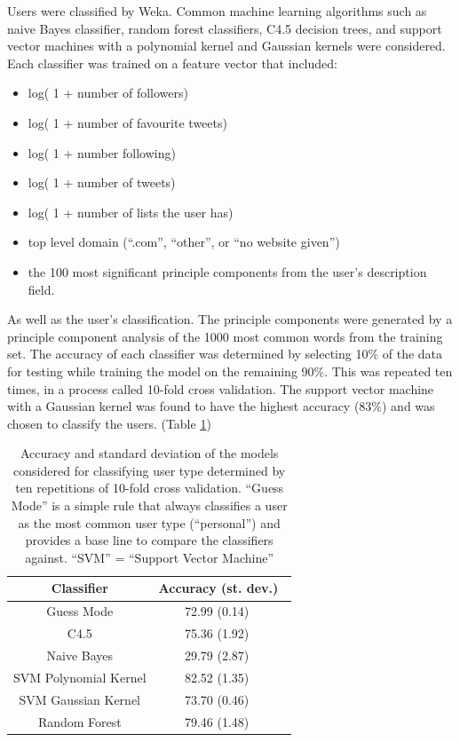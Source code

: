 Users were classified by Weka. Common machine learning algorithms \cite{Burger:2011wl, Go:2009ut, anti2008krause} such as naive Bayes classifier, random forest classifiers, C4.5 decision trees, and support vector machines with a polynomial kernel and Gaussian kernels were considered. Each classifier was trained on a feature vector that included:

\begin{itemize}
\item log( 1 + number of followers)
\item log( 1 + number of favourite tweets)
\item log( 1 + number following)
\item log( 1 + number of tweets)
\item log( 1 + number of lists the user has)
\item top level domain (``.com'', ``other'', or ``no website given'')
\item the 100 most significant principle components from the user's description field.
\end{itemize}

As well as the user's classification. The principle components were generated by a principle component analysis of the 1000 most common words from the training set. The accuracy of each classifier was determined by selecting 10\% of the data for testing while training the model on the remaining 90\%. This was repeated ten times, in a process called 10-fold cross validation.\cite{Marsland:2009uj} The support vector machine with a Gaussian kernel was found to have the highest accuracy (83\%) and was chosen to classify the users. (Table \ref{table:user_classifier})

\begin{table}
\centering
\begin{tabular}{|c|c|} \hline
Classifier & Accuracy (st. dev.)\ \\ \hline 
Guess Mode & 72.99 (0.14) \ \\ \hline
C4.5 & 75.36 (1.92) \ \\ \hline
Naive Bayes & 29.79 (2.87) \ \\ \hline
SVM Polynomial Kernel & 82.52 (1.35) \ \\ \hline
SVM Gaussian Kernel & 73.70 (0.46) \ \\ \hline
Random Forest & 79.46 (1.48) \ \\ \hline
\end{tabular}
\caption{Accuracy and standard deviation of the models considered for classifying user type determined by ten repetitions of 10-fold cross validation.  ``Guess Mode'' is a simple rule that always classifies a user as the most common user type (``personal'') and provides a base line to compare the classifiers against. ``SVM'' = ``Support Vector Machine''}
\label{table:user_classifier}
\end{table}

